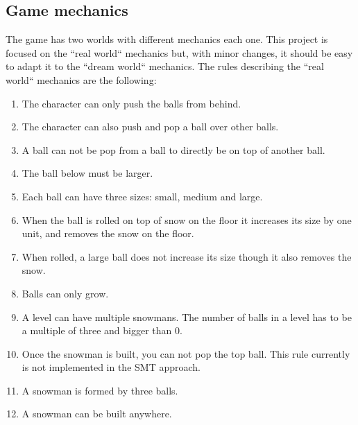 \documentclass{report}
\theoremstyle{plain}
\begin{document}
\subsection{Game mechanics}
The game has two worlds with different mechanics each one. This project is focused on the  ``real world`` mechanics but, with minor changes, it should be easy to adapt it to the ``dream world`` mechanics.
The rules describing the ``real world`` mechanics are the following:
\begin{enumerate}
\item The character can only push the balls from behind. 
\item The character can also push and pop a ball over other balls.
\item A ball can not be pop from a ball to directly be on top of another ball.
\item The ball below must be larger.
\item Each ball can have three sizes: small, medium and large.
\item When the ball is rolled on top of snow on the floor it increases its size by one unit, and removes the snow on the floor.
\item When rolled, a large ball does not increase its size though it also removes the snow.
\item Balls can only grow.
\item A level can have multiple snowmans. The number of balls in a level has to be a multiple of three and bigger than 0.
\item Once the snowman is built, you can not pop the top ball. This rule currently is not implemented in the SMT approach. %
\item A snowman is formed by three balls.
\item A snowman can be built anywhere.
\end{enumerate}

\newcommand{\andyWidth}{0.2}

\newpage
\end{document}
